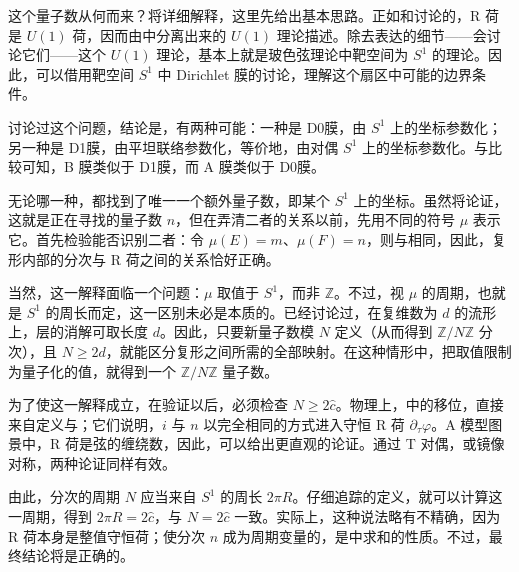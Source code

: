这个量子数从何而来？将详细解释，这里先给出基本思路。正如和讨论的，R 荷是 $U(1)$ 荷，因而由中分离出来的 $U(1)$ 理论描述。除去表达的细节——会讨论它们——这个 $U(1)$ 理论，基本上就是玻色弦理论中靶空间为 $S^1$ 的理论。因此，可以借用靶空间 $S^1$ 中 Dirichlet 膜的讨论，理解这个扇区中可能的边界条件。

讨论过这个问题，结论是，有两种可能：一种是 D0膜，由 $S^1$ 上的坐标参数化；另一种是 D1膜，由平坦联络参数化，等价地，由对偶 $S^1$ 上的坐标参数化。与比较可知，B 膜类似于 D1膜，而 A 膜类似于 D0膜。

无论哪一种，都找到了唯一一个额外量子数，即某个 $S^1$ 上的坐标。虽然将论证，这就是正在寻找的量子数 $n$，但在弄清二者的关系以前，先用不同的符号 $\mu$ 表示它。首先检验能否识别二者：令 $\mu(E)=m$、$\mu(F)=n$，则与相同，因此，复形内部的分次与 R 荷之间的关系恰好正确。

当然，这一解释面临一个问题：$\mu$ 取值于 $S^1$，而非 $\mathbb{Z}$。不过，视 $\mu$ 的周期，也就是 $S^1$ 的周长而定，这一区别未必是本质的。已经讨论过，在复维数为 $d$ 的流形上，层的消解可取长度 $d$。因此，只要新量子数模 $N$ 定义（从而得到 $\mathbb{Z}/N\mathbb{Z}$ 分次），且 $N\ge2d$，就能区分复形之间所需的全部映射。在这种情形中，把取值限制为量子化的值，就得到一个 $\mathbb{Z}/N\mathbb{Z}$ 量子数。

为了使这一解释成立，在验证以后，必须检查 $N\ge2\hat c$。物理上，中的移位，直接来自定义与；它们说明，$i$ 与 $n$ 以完全相同的方式进入守恒 R 荷 $\partial_\tau\varphi$。A 模型图景中，R 荷是弦的缠绕数，因此，可以给出更直观的论证。通过 T 对偶，或镜像对称，两种论证同样有效。

由此，分次的周期 $N$ 应当来自 $S^1$ 的周长 $2\pi R$。仔细追踪的定义，就可以计算这一周期，得到 $2\pi R=2\hat c$，与 $N=2\hat c$ 一致。实际上，这种说法略有不精确，因为 R 荷本身是整值守恒荷；使分次 $n$ 成为周期变量的，是中求和的性质。不过，最终结论将是正确的。

